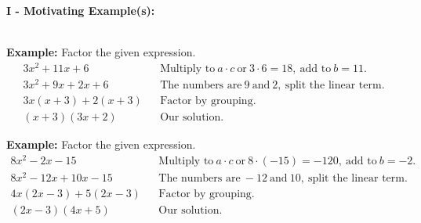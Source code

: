 \documentclass[12pt]{article}
\theoremstyle{definition}
\begin{document}
{\bf I - Motivating Example(s):}\\
\ \par
{\bf Example:} Factor the given expression.
  \begin{eqnarray*}
    3 x^2 + 11 x + 6 &  & \text{Multiply to} \ a\cdot c \ \text{or} \  3 \cdot 6  =18, \ \text{add to} \ b=11.\\
    3 x^2 + 9 x + 2 x + 6 &  & \text{The numbers are} \ 9
\ \text{and} \ 2, \ \text{split the linear term.}\\
    3 x (x + 3) + 2 (x + 3) &  & \text{Factor by grouping.}\\
    (x + 3) (3 x + 2) &  & \text{Our solution.}
  \end{eqnarray*}

{\bf Example:} Factor the given expression.
  \begin{eqnarray*}
    8 x^2 - 2 x - 15 &  & \text{Multiply to} \ a\cdot c \ \text{or} \ 8\cdot (- 15) = - 120, \ \text{add to} \ b=- 2.\\
    8 x^2 - 12 x + 10 x - 15 &  & \text{The numbers are} \ - 12 \ \text{and} \ 10, \ \text{split the linear term.}\\
    4 x (2 x - 3) + 5 (2 x - 3) &  & \text{Factor by grouping.}\\
    (2 x - 3) (4 x + 5) &  & \text{Our solution.}
  \end{eqnarray*}
\end{document}
